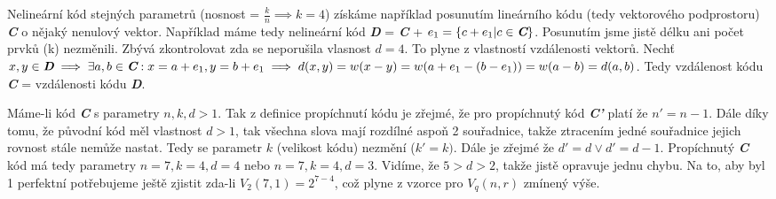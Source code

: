 \documentclass[12pt, a4paper]{article}
\begin{document}
Nelineární kód stejných parametrů (nosnost = $\frac{k}{n} \implies k=4$) získáme například posunutím lineárního kódu (tedy vektorového podprostoru) \textit{\textbf{C}} o nějaký nenulový vektor. Například máme tedy nelineární kód \textit{\textbf{D}} = \textit{\textbf{C}} + $e_1 = \{c + e_1 | c \in \textit{\textbf{C}}\}$. Posunutím jsme jistě délku ani počet prvků (k) nezměnili. Zbývá zkontrolovat zda se neporušila vlasnost $d=4$. To plyne z vlastností vzdálenosti vektorů. Nechť $x,y \in \textit{\textbf{D}} \implies \exists a,b \in \textit{\textbf{C}} : x=a+e_1, y=b+e_1 \implies d(x,y) = w(x-y) = w(a+e_1-(b-e_1))=w(a-b)=d(a,b)$. Tedy vzdálenost kódu \textit{\textbf{C}} = vzdálenosti kódu \textit{\textbf{D}}.

Máme-li kód \textit{\textbf{C}} s parametry $n,k,d>1$. Tak z definice propíchnutí kódu je zřejmé, že pro propíchnutý kód \textit{\textbf{C'}} platí že $n'=n-1$. Dále díky tomu, že původní kód měl vlastnost $d>1$, tak všechna slova mají rozdílné aspoň 2 souřadnice, takže ztracením jedné souřadnice jejich rovnost stále nemůže nastat. Tedy se parametr $k$ (velikost kódu) nezmění ($k'=k)$. Dále je zřejmé že $d'= d \vee d'=d-1$. Propíchnutý \textit{\textbf{C}} kód má tedy parametry $n=7,k=4,d=4$ nebo $n=7,k=4,d=3$. Vidíme, že $5>d>2$, takže jistě opravuje jednu chybu. Na to, aby byl 1 perfektní potřebujeme ještě zjistit zda-li $V_{2}(7,1)=2^{7-4}$, což plyne z vzorce pro $V_{q}(n,r)$ zmínený výše.
\end{document}
